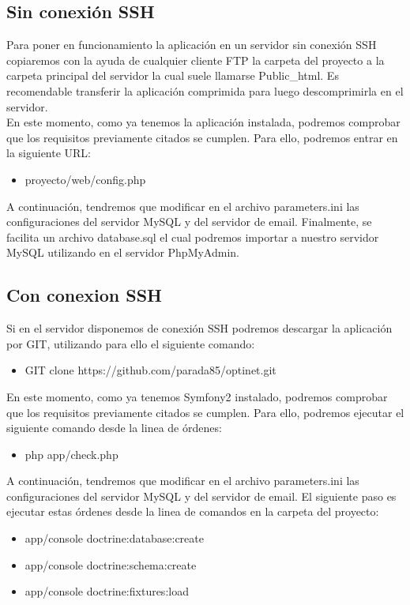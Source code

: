 \subsection{Sin conexión SSH}
Para poner en funcionamiento la aplicación en un servidor sin conexión SSH copiaremos con la ayuda de cualquier cliente FTP la carpeta del proyecto a la carpeta principal del servidor la cual suele llamarse Public\_html. Es recomendable transferir la aplicación comprimida para luego descomprimirla en el servidor.\\
En este momento, como ya tenemos la aplicación instalada, podremos comprobar que los requisitos previamente citados se cumplen. Para ello, podremos entrar en la siguiente URL:
\begin{itemize}
\item proyecto/web/config.php
\end{itemize}
A continuación, tendremos que modificar en el archivo parameters.ini las configuraciones del servidor MySQL y del servidor de email. Finalmente, se facilita un archivo database.sql el cual podremos importar a nuestro servidor MySQL utilizando en el servidor PhpMyAdmin.

\subsection{Con conexion SSH}

Si en el servidor disponemos de conexión SSH podremos descargar la aplicación por GIT, utilizando para ello el siguiente comando:
\begin{itemize}
\item GIT clone https://github.com/parada85/optinet.git
\end{itemize}
En este momento, como ya tenemos Symfony2 instalado, podremos comprobar que los requisitos previamente citados se cumplen. Para ello, podremos ejecutar el siguiente comando desde la linea de órdenes:
\begin{itemize}
\item php app/check.php
\end{itemize}

A continuación, tendremos que modificar en el archivo parameters.ini las configuraciones del servidor MySQL y del servidor de email. El siguiente paso es ejecutar estas órdenes desde la linea de comandos en la carpeta del proyecto:
\begin{itemize}
\item app/console doctrine:database:create 
\item app/console doctrine:schema:create
\item app/console doctrine:fixtures:load
\end{itemize}

